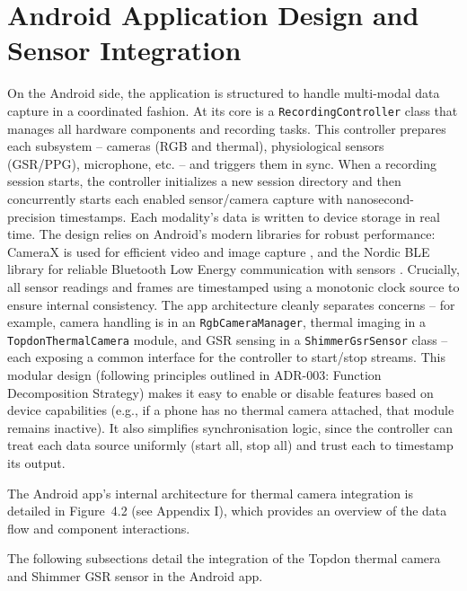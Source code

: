 \section{Android Application Design and Sensor Integration}\label{sec:4-2}
On the Android side, the application is structured to handle multi-modal data capture in a coordinated fashion. At its core is a \texttt{RecordingController} class that manages all hardware components and recording tasks. This controller prepares each subsystem -- cameras (RGB and thermal), physiological sensors (GSR/PPG), microphone, etc. -- and triggers them in sync. When a recording session starts, the controller initializes a new session directory and then concurrently starts each enabled sensor/camera capture with nanosecond-precision timestamps. Each modality's data is written to device storage in real time. The design relies on Android's modern libraries for robust performance: CameraX is used for efficient video and image capture \cite{ref13}, and the Nordic BLE library for reliable Bluetooth Low Energy communication with sensors \cite{ref14}. Crucially, all sensor readings and frames are timestamped using a monotonic clock source to ensure internal consistency. The app architecture cleanly separates concerns -- for example, camera handling is in an \texttt{RgbCameraManager}, thermal imaging in a \texttt{TopdonThermalCamera} module, and GSR sensing in a \texttt{ShimmerGsrSensor} class -- each exposing a common interface for the controller to start/stop streams. This modular design (following principles outlined in ADR-003: Function Decomposition Strategy) makes it easy to enable or disable features based on device capabilities (e.g., if a phone has no thermal camera attached, that module remains inactive). It also simplifies synchronisation logic, since the controller can treat each data source uniformly (start all, stop all) and trust each to timestamp its output.

The Android app's internal architecture for thermal camera integration is detailed in Figure~4.2 (see Appendix I), which provides an overview of the data flow and component interactions.

The following subsections detail the integration of the Topdon thermal camera and Shimmer GSR sensor in the Android app.

